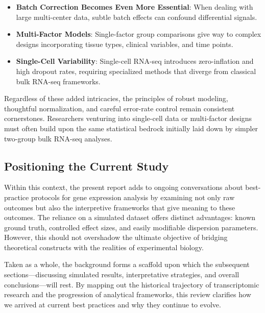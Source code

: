 \documentclass[12pt]{article}
\begin{document}
\begin{itemize}
    \item \textbf{Batch Correction Becomes Even More Essential}: When dealing with large multi-center data, subtle batch effects can confound differential signals.\cite{lin2020improving}
    \item \textbf{Multi-Factor Models}: Single-factor group comparisons give way to complex designs incorporating tissue types, clinical variables, and time points.\cite{whittington2021comparing}
    \item \textbf{Single-Cell Variability}: Single-cell RNA-seq introduces zero-inflation and high dropout rates, requiring specialized methods that diverge from classical bulk RNA-seq frameworks.\cite{robinson2010edger}
\end{itemize}

Regardless of these added intricacies, the principles of robust modeling, thoughtful normalization, and careful error-rate control remain consistent cornerstones. Researchers venturing into single-cell data or multi-factor designs must often build upon the same statistical bedrock initially laid down by simpler two-group bulk RNA-seq analyses.

\subsection{Positioning the Current Study}
Within this context, the present report adds to ongoing conversations about best-practice protocols for gene expression analysis by examining not only raw outcomes but also the interpretive frameworks that give meaning to these outcomes. The reliance on a simulated dataset offers distinct advantages: known ground truth, controlled effect sizes, and easily modifiable dispersion parameters. However, this should not overshadow the ultimate objective of bridging theoretical constructs with the realities of experimental biology.

Taken as a whole, the background forms a scaffold upon which the subsequent sections—discussing simulated results, interpretative strategies, and overall conclusions—will rest. By mapping out the historical trajectory of transcriptomic research and the progression of analytical frameworks, this review clarifies how we arrived at current best practices and why they continue to evolve.


\end{document}
